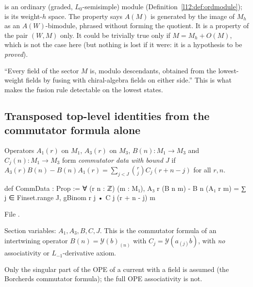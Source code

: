 \begin{dictionary}
 is an ordinary (graded, $L_0$-semisimple) module (Definition~\ref{l12:def:ordmodule});
 is its weight-$h$ space.  The property says $A(M)$ is generated by the image of $M_h$
as an $A(W)$-bimodule, phrased without forming the quotient.  It is a property of the pair
$(W,M)$ only.  It could be trivially true only if $M=M_h+O(M)$, which is not the case here (but
nothing is lost if it were: it is a hypothesis to be \emph{proved}).
\end{dictionary}

\begin{physics}
``Every field of the sector $M$ is, modulo descendants, obtained from the lowest-weight fields by
fusing with chiral-algebra fields on either side.''  This is what makes the fusion rule detectable on
the lowest states.
\end{physics}

\subsection{Transposed top-level identities from the commutator formula alone}

\begin{definition}\label{ch14:def:commdata}
Operators $A_1(r)$ on $M_1$, $A_3(r)$ on $M_3$, $B(n):M_1\to M_3$ and $C_j(n):M_1\to M_3$ form
\emph{commutator data with bound $J$} if
$A_3(r)B(n)-B(n)A_1(r)=\sum_{j<J}\binom rj C_j(r+n-j)$ for all $r,n$.
\end{definition}
\begin{leancode}
def CommData : Prop :=
  ∀ (r n : ℤ) (m : M₁), A₃ r (B n m) - B n (A₁ r m)
    = ∑ j ∈ Finset.range J, gBinom r j • C j (r + n - j) m
\end{leancode}
File .

\begin{dictionary}
Section variables: $A_1,A_3,B,C,J$.  This is the commutator formula of an intertwining operator
$B(n)=\mathcal Y(b)_{(n)}$ with $C_j=\mathcal Y(a_{(j)}b)$, with \emph{no} associativity or
$L_{-1}$-derivative axiom.
\end{dictionary}

\begin{physics}
Only the singular part of the OPE of a current with a field is assumed (the Borcherds commutator
formula); the full OPE associativity is not.
\end{physics}

